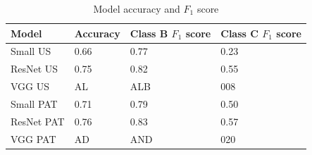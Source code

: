 \begin{table}[h]
\centering
\begin{tabular}{ |p{3cm}||p{3cm}|p{3cm}|p{3cm}|  }
 \hline
 Model       & Accuracy & Class B $F_1$ score & Class C $F_1$ score\\
 \hline
 Small  US   & 0.66  & 0.77 &  0.23\\
 ResNet US   & 0.75  & 0.82 &  0.55\\
 VGG US      & AL  & ALB &  008\\
 Small PAT   & 0.71  & 0.79 &  0.50\\
 ResNet PAT  & 0.76  & 0.83 &  0.57\\
 VGG PAT     & AD  & AND &  020\\
 \hline
\end{tabular}
\caption{Model accuracy and $F_1$ score}
\label{acctable}
\end{table}